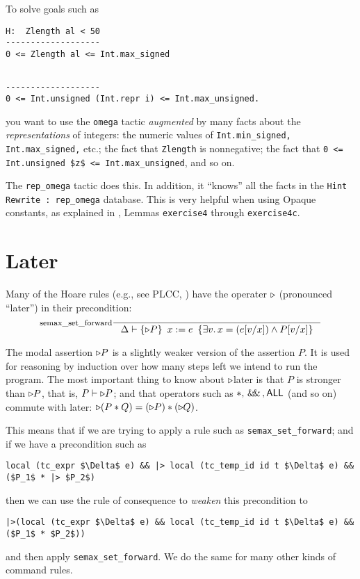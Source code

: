 \documentclass[12pt,fleqn,openany,oneside,showtrims]{memoir}
\newcommand{\ychapter}[2]{\chapter[#1]{#1}}
\begin{document}
To solve goals such as

\begin{minipage}{2.5in}
\begin{lstlisting}
H:  Zlength al < 50
-------------------  
0 <= Zlength al <= Int.max_signed
\end{lstlisting}
\end{minipage}\qquad
\begin{minipage}{2.5in}
\begin{lstlisting}

-------------------  
0 <= Int.unsigned (Int.repr i) <= Int.max_unsigned.
\end{lstlisting}
\end{minipage}

you want to use the \lstinline{omega} tactic \emph{augmented} by many facts
about the \emph{representations} of integers:
the numeric values of
\lstinline{Int.min_signed,}
\lstinline{Int.max_signed,}
etc.;
the fact that \lstinline{Zlength} is nonnegative;
the fact that \lstinline{0 <= Int.unsigned $z$ <= Int.max_unsigned},
and so on.

The \lstinline{rep_omega} tactic does this.
In addition, it ``knows'' all the facts in the 
\lstinline{Hint Rewrite : rep_omega} database.
This is very helpful when using Opaque constants,
as explained in , Lemmas
\lstinline{exercise4} through \lstinline{exercise4c}.


\ychapter{Later}{(See PLCC \autoref{ch:stepindex})}
Many of the Hoare rules (e.g., see PLCC, )
have the operater $\triangleright$ (pronounced ``later'') in their precondition:
\[\inference[semax\_set\_forward]{}{
\Delta\vdash\triple{\later P}{~x:=e~}{\exists v.\,x=(e[v/x])\wedge P[v/x]}
}\label{rule:semax-set-forward}\]

The modal assertion $\triangleright P$ is a slightly weaker version of the
assertion $P$.  It is used for reasoning by induction over how many
steps left we intend to run the program.  The most important
thing to know about $\triangleright$later is that $P$ is stronger than
$\triangleright P$, that is, $P \vdash \triangleright P$; and that operators such
as $*, \,\mathsf{\&\hspace{-.2em}\&}\,, \mathsf{ALL}$ (and so on) commute with later:
$\triangleright (P*Q)= (\triangleright P) * (\triangleright Q)$.

This means that if we are trying to apply a rule such as
\lstinline{semax_set_forward}; and if we
have a precondition such as
\begin{lstlisting}
local (tc_expr $\Delta$ e) && |> local (tc_temp_id id t $\Delta$ e) && ($P_1$ * |> $P_2$)
\end{lstlisting}
then we can use the rule of consequence to \emph{weaken}
this precondition to
\begin{lstlisting}
|>(local (tc_expr $\Delta$ e) && local (tc_temp_id id t $\Delta$ e) && ($P_1$ * $P_2$))
\end{lstlisting}
and then apply \lstinline{semax_set_forward}.  We do the same for many other kinds of command rules.
\end{document}
